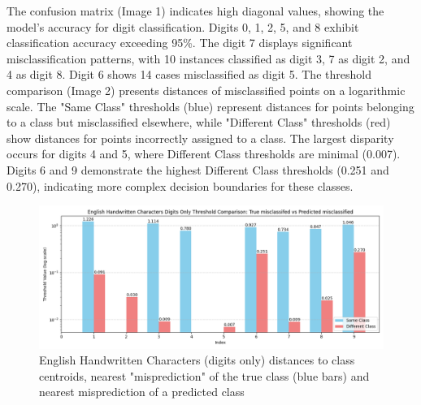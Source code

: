 The confusion matrix (Image 1) indicates high diagonal values, showing the model's accuracy for digit classification. Digits 0, 1, 2, 5, and 8 exhibit classification accuracy exceeding 95\%. The digit 7 displays significant misclassification patterns, with 10 instances classified as digit 3, 7 as digit 2, and 4 as digit 8. Digit 6 shows 14 cases misclassified as digit 5.
The threshold comparison (Image 2) presents distances of misclassified points on a logarithmic scale. The "Same Class" thresholds (blue) represent distances for points belonging to a class but misclassified elsewhere, while "Different Class" thresholds (red) show distances for points incorrectly assigned to a class. The largest disparity occurs for digits 4 and 5, where Different Class thresholds are minimal (0.007). Digits 6 and 9 demonstrate the highest Different Class thresholds (0.251 and 0.270), indicating more complex decision boundaries for these classes.

\begin{figure}[ht]
    \centering
    \includegraphics[width=0.99\columnwidth]{Figures/Results/HandwrittenCharacters/english_handwritten_characters_digits_only_thresholds.png}
    \caption{English Handwritten Characters (digits only) distances to class centroids, nearest "misprediction" of the true class (blue bars) and nearest misprediction of a predicted class}
\label{fig:english_handwritten_characters_digits_only_thresholds}
\end{figure}

